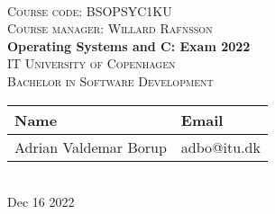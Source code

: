 \newcommand{\HRule}{\rule{1.25\linewidth}{0.5mm}}
\center
\ \\[2cm]
\hbox{}
\vspace{0.5cm}
\textsc{\large Course code: BSOPSYC1KU}
\\[0.2cm]
\textsc{\large Course manager: Willard Rafnsson}
\\[1cm]
\hbox{\makebox[1\textwidth][c]{\HRule}}
\vspace{0.4cm}
{ \huge \bfseries Operating Systems and C: Exam 2022}
\\[0.6cm]
\hbox{\makebox[1\textwidth][c]{\HRule}}
\vspace{0.9cm}
\textsc{\large IT University of Copenhagen}
\\[0.2cm]
\textsc{\large Bachelor in Software Development}
\\[1.5cm]
\begin{tabular}{ll}
\toprule
\textbf{Name} & \textbf{Email} \\
\midrule
Adrian Valdemar Borup & adbo@itu.dk \\
\bottomrule
\end{tabular}
\\[2cm]
{\large Dec 16 2022}
\\[2cm]
\vfill